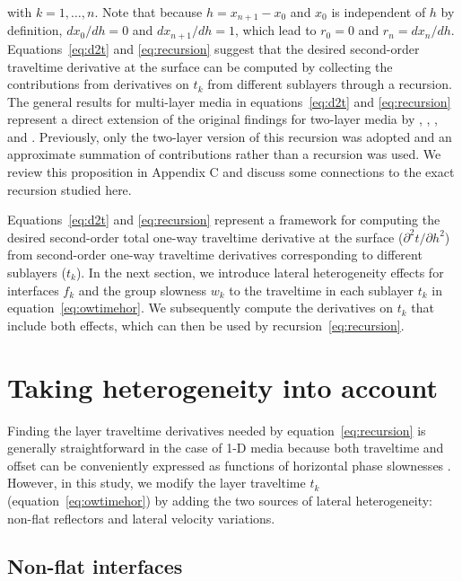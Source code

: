 with $k = 1, \dots, n$. Note that because $h=x_{n+1}-x_0$ and $x_0$ is independent of $h$ by definition, $dx_0/dh = 0$ and $dx_{n+1}/dh = 1$, which lead to $r_0 = 0$ and $r_n = dx_{n}/dh$. Equations~\ref{eq:d2t} and \ref{eq:recursion} suggest that the desired second-order traveltime derivative at the surface can be computed by collecting the contributions from derivatives on $t_k$ from different sublayers through a recursion. The general results for multi-layer media in equations~\ref{eq:d2t} and \ref{eq:recursion} represent a direct extension of the original findings for two-layer media by \cite{blias1981}, \cite{bliasgrit1984}, \cite{gritsenko}, and \cite{goldin}. Previously, only the two-layer version of this recursion was adopted and an approximate summation of contributions rather than a recursion was used. We review this proposition in Appendix C and discuss some connections to the exact recursion studied here.

Equations~\ref{eq:d2t} and \ref{eq:recursion} represent a framework for computing the desired second-order total one-way traveltime derivative at the surface ($\partial^2 t/\partial h^2$) from second-order one-way traveltime derivatives corresponding to different sublayers ($t_k$). In the next section, we introduce lateral heterogeneity effects for interfaces $f_k$ and the group slowness $w_k$ to the traveltime in each sublayer $t_k$ in equation~\ref{eq:owtimehor}. We subsequently compute the derivatives on $t_k$ that include both effects, which can then be used by recursion~\ref{eq:recursion}.


\section{Taking heterogeneity into account}
Finding the layer traveltime derivatives needed by equation~\ref{eq:recursion} is generally straightforward in the case of 1-D media because both traveltime and offset can be conveniently expressed as functions of horizontal phase slownesses \cite[]{zoneinterval,korenravvetriclinic}. However, in this study, we modify the layer traveltime $t_k$ (equation~\ref{eq:owtimehor}) by adding the two sources of lateral heterogeneity: non-flat reflectors and lateral velocity variations.

\subsection{Non-flat interfaces}


